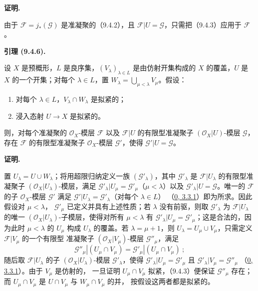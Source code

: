 \documentclass[UTF8,fontset=none,11pt,oneside,openany]{ctexbook}
\newenvironment{lemma}[1][]{%
  \par\medskip\noindent\textbf{引理 (#1).}\ %
}{\par}
\newenvironment{proof}{%
  \par\medskip\noindent\textbf{证明.}\ %
}{\par}
\let\EGAOriginalLabel\label
\renewcommand{\label}[1]{\phantomsection\EGAOriginalLabel{#1}}
\begin{document}
\begin{proof}
由于 $\mathscr{F}=j_*(\mathscr{G})$ 是准凝聚的（9.4.2），且
$\mathscr{F}|U=\mathscr{G}$，只需把（9.4.3）应用于 $\mathscr{F}$。
\end{proof}

\begin{lemma}[9.4.6]
\label{I.9.4.6-fr}
设 $X$ 是预概形，$L$ 是良序集，$(V_\lambda)_{\lambda\in L}$ 是由仿射开集构成的
$X$ 的覆盖，$U$ 是 $X$ 的一个开集；对每个 $\lambda\in L$，置
$W_\lambda=\bigcup_{\mu<\lambda}V_\mu$。假设：
\begin{enumerate}
  \item[1\textsuperscript{o}] 对每个 $\lambda\in L$，$V_\lambda\cap W_\lambda$ 是拟紧的；
  \item[2\textsuperscript{o}] 浸入态射 $U\to X$ 是拟紧的。
\end{enumerate}
则，对每个准凝聚的 $\mathscr{O}_X$-模层 $\mathscr{F}$ 以及
$\mathscr{F}|U$ 的有限型准凝聚子 $(\mathscr{O}_X|U)$-模层 $\mathscr{G}$，存在
$\mathscr{F}$ 的有限型准凝聚子 $\mathscr{O}_X$-模层 $\mathscr{G}'$，使得
$\mathscr{G}'|U=\mathscr{G}$。
\end{lemma}

\begin{proof}
置 $U_\lambda=U\cup W_\lambda$；将用超限归纳定义一族
$(\mathscr{G}'_\lambda)$，其中 $\mathscr{G}'_\lambda$ 是
$\mathscr{F}|U_\lambda$ 的有限型准凝聚子 $(\mathscr{O}_X|U_\lambda)$-模层，满足
$\mathscr{G}'_\lambda|U_\mu=\mathscr{G}'_\mu$（$\mu<\lambda$）以及
$\mathscr{G}'_\lambda|U=\mathscr{G}$。唯一的 $\mathscr{F}$ 的子
$\mathscr{O}_X$-模层 $\mathscr{G}'$ 满足
$\mathscr{G}'|U_\lambda=\mathscr{G}'_\lambda$（对每个 $\lambda\in L$）
（\hyperref[0.3.3.1-fr]{0, 3.3.1}）即为所求。因此假设对 $\mu<\lambda$，
$\mathscr{G}'_\mu$ 已定义并具有上述性质；若 $\lambda$ 没有前驱，则取
$\mathscr{G}'_\lambda$ 为 $\mathscr{F}|U_\lambda$ 的唯一
$(\mathscr{O}_X|U_\lambda)$-子模层，使得对所有 $\mu<\lambda$ 有
$\mathscr{G}'_\lambda|U_\mu=\mathscr{G}'_\mu$；这是合法的，因为此时
$\mu<\lambda$ 的 $U_\mu$ 构成 $U_\lambda$ 的覆盖。若 $\lambda=\mu+1$，则
$U_\lambda=U_\mu\cup V_\mu$，只需定义 $\mathscr{F}|V_\mu$ 的一个有限型
准凝聚子 $(\mathscr{O}_X|V_\mu)$-模层 $\mathscr{G}''_\mu$，满足
\[
  \mathscr{G}''_\mu|(U_\mu\cap V_\mu)
  =\mathscr{G}'_\mu|(U_\mu\cap V_\mu)~;
\]
随后取 $\mathscr{F}|U_\lambda$ 的子 $(\mathscr{O}_X|U_\lambda)$-模层
$\mathscr{G}'_\lambda$，使得
$\mathscr{G}'_\lambda|U_\mu=\mathscr{G}'_\mu$ 且
$\mathscr{G}'_\lambda|V_\mu=\mathscr{G}''_\mu$
（\hyperref[0.3.3.1-fr]{0, 3.3.1}）。由于 $V_\mu$ 是仿射的，
一旦证明 $U_\mu\cap V_\mu$ 拟紧，（9.4.3）便保证 $\mathscr{G}''_\mu$ 存在；
而 $U_\mu\cap V_\mu$ 是 $U\cap V_\mu$ 与 $W_\mu\cap V_\mu$ 的并，
按假设这两者都是拟紧的。
\end{proof}
\end{document}
